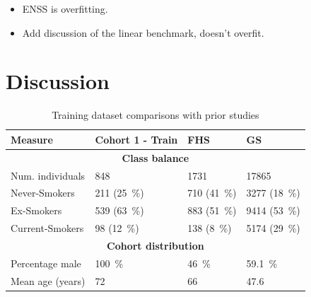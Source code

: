 \documentclass{article} %
\begin{document}
\begin{itemize}
    \item ENSS is overfitting.
    \item Add discussion of the linear benchmark, doesn't overfit.
\end{itemize}

\section{Discussion}

\begin{table}
    \caption{Training dataset comparisons with prior studies} \label{table:dataset-compare-external}
    \begin{tabularx}{\textwidth}{X >{\raggedleft\arraybackslash}X >{\raggedleft\arraybackslash}X >{\raggedleft\arraybackslash}X}
        \toprule
        \textbf{Measure} & \textbf{Cohort 1 - Train}     & \textbf{FHS}                  & \textbf{GS}                    \\
        \midrule
        \multicolumn{4}{c}{\textbf{Class balance}}                                                                        \\
        \midrule
        Num. individuals & \num{848}                     & \num{1731}                    & \num{17865}                    \\
        \addlinespace
        Never-Smokers    & \num{211} (\SI{25}{\percent}) & \num{710} (\SI{41}{\percent}) & \num{3277} (\SI{18}{\percent}) \\
        \addlinespace
        Ex-Smokers       & \num{539} (\SI{63}{\percent}) & \num{883} (\SI{51}{\percent}) & \num{9414} (\SI{53}{\percent}) \\
        \addlinespace
        Current-Smokers  & \num{98} (\SI{12}{\percent})  & \num{138} (\SI{8}{\percent})  & \num{5174} (\SI{29}{\percent}) \\
        \midrule
        \multicolumn{4}{c}{\textbf{Cohort distribution}}                                                                  \\
        \midrule
        Percentage male  & \SI{100}{\percent}            & \SI{46}{\percent}             & \SI{59.1}{\percent}            \\
        Mean age (years) & \num{72}                      & \num{66}                      & \num{47.6}                     \\
        \bottomrule
    \end{tabularx}
\end{table}
\end{document}
